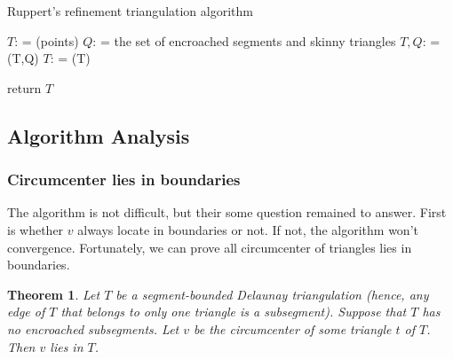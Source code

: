 \documentclass[letterpaper,12pt]{article}
\newtheorem{theorem}[lemma]{Theorem}
\begin{document}
\begin{algorithm}[!]
\caption{Ruppert's refinement triangulation algorithm}
\label{algo:01} 
 
   

  $T$: = \DelaunayTriangulation(points) \; $Q$: = the set of encroached segments and skinny
triangles \; $T, Q$: = \AddMidOfEncroach(T,Q) \; $T$: = \DelExternalSegment(T) \;

   return $T$ \;
  

\end{algorithm}

\subsection{Algorithm Analysis}
\label{sec:01:03} 

\subsubsection{Circumcenter lies in boundaries}
\label{sec:01:03:01} 

The algorithm is not difficult, but their some question remained to answer. First
is whether $v$ always locate in boundaries or not. If not, the algorithm won't
convergence. Fortunately, we can prove all circumcenter of triangles lies in boundaries.

\begin{theorem} 
Let $T$ be a segment-bounded Delaunay triangulation (hence, any edge of $T$ that
belongs to only one triangle is a subsegment). Suppose that $T $ has no encroached subsegments. Let
$v$ be the circumcenter of some triangle $t$ of $T$. Then $v$ lies in $T$.\cite{Richard}
\end{theorem}
\end{document}
